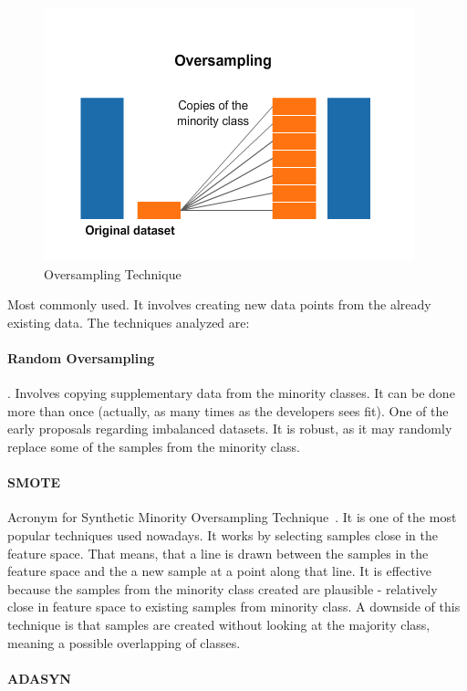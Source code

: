 \begin{figure}[h!]
\centering
\includegraphics[width=.7\textwidth]{figures/Oversampling.png}
\caption{Oversampling Technique \cite{OverUnderIbm2019}}
\label{fig:oversampling}
\end{figure}

Most commonly used. It involves creating new data points from the already 
existing data. The techniques analyzed are:

\paragraph{Random Oversampling}. Involves copying supplementary data from the
minority classes. It can be done more than once (actually, as many times as the
developers sees fit). One of the early proposals regarding imbalanced datasets.
It is robust, as it may randomly replace some of the samples from the minority 
class.

\paragraph{SMOTE}\label{smote}

Acronym for Synthetic Minority Oversampling Technique~\cite{ChawlaBHK02}. 
It is one of the most popular techniques used nowadays. It works by selecting 
samples close in the feature space. That means, that a line is drawn between
the samples in the feature space and the a new sample at a point along that 
line. It is effective because the samples from the minority class created are
plausible - relatively close in feature space to existing samples from minority 
class. A downside of this technique is that samples are created without looking
at the majority class, meaning a possible overlapping of classes.

\paragraph{ADASYN}

